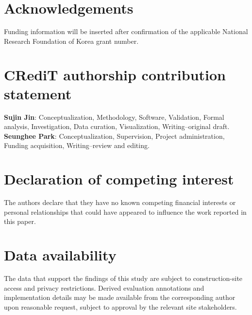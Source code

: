 \documentclass[preprint,12pt,numbers]{elsarticle}
\begin{document}







\section*{Acknowledgements}
Funding information will be inserted after confirmation of the applicable National Research Foundation of Korea grant number.

\section*{CRediT authorship contribution statement}
\textbf{Sujin Jin}: Conceptualization, Methodology, Software, Validation, Formal analysis, Investigation, Data curation, Visualization, Writing--original draft. \textbf{Seunghee Park}: Conceptualization, Supervision, Project administration, Funding acquisition, Writing--review and editing.

\section*{Declaration of competing interest}
The authors declare that they have no known competing financial interests or personal relationships that could have appeared to influence the work reported in this paper.

\section*{Data availability}
The data that support the findings of this study are subject to construction-site access and privacy restrictions. Derived evaluation annotations and implementation details may be made available from the corresponding author upon reasonable request, subject to approval by the relevant site stakeholders.



\end{document}
